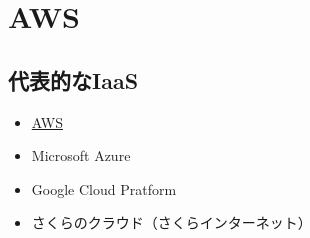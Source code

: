 \section{AWS}
\tocc
\subsection{代表的なIaaS}
\begin{frame}[t]{\ftitle}
    \begin{itemize}
        \setlength{\itemsep}{1em}
        \item \underline{AWS}
        \item Microsoft Azure
        \item Google Cloud Pratform
        \item さくらのクラウド（さくらインターネット）
    \end{itemize}
\end{frame}
